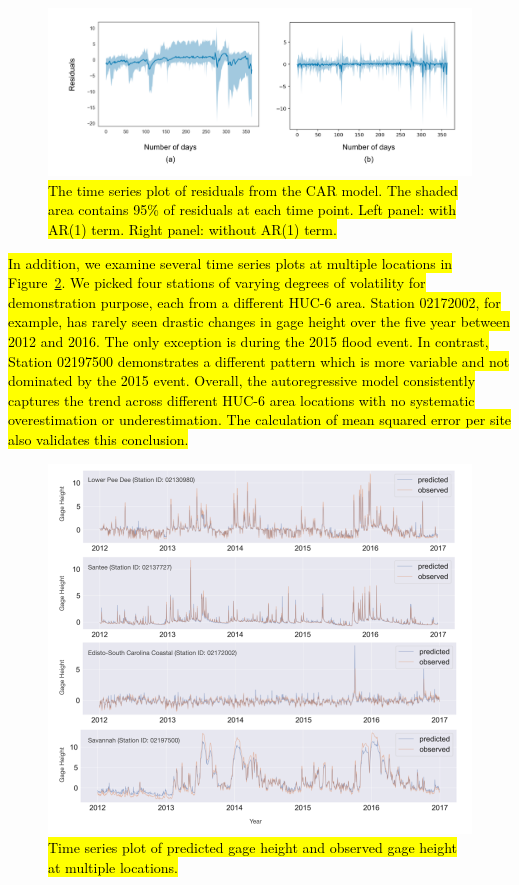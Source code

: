 \begin{figure}[htbp]
\centering
\includegraphics[width=1\textwidth]{../images/residuals_over_time_for_ar_and_non_ar.png}
\caption{\hl{The time series plot of residuals from the CAR model. The shaded area contains {95\%} of residuals at each time point. Left panel: with AR(1) term. Right panel: without AR(1) term.}}
\label{fig:resid_time_series}
\end{figure}

\hl{In addition, we examine several time series plots at multiple locations in Figure~{\ref{fig:per_site}}.
We picked four stations of varying degrees of volatility for demonstration purpose, each from a different HUC-6 area.
Station 02172002, for example, has rarely seen drastic changes in gage height over the five year between 2012
and 2016.
The only exception is during the 2015 flood event.
In contrast, Station 02197500 demonstrates a different pattern which is more variable and not dominated by the 2015
event.
Overall, the autoregressive model consistently captures the trend across different HUC-6 area locations
with no systematic overestimation or underestimation.
The calculation of mean squared error per site also validates this conclusion.} \\

\begin{figure}[htbp]
\centering
\includegraphics[width=1\textwidth]{../images/prediction_of_four_sites.png}
\caption{\hl{Time series plot of predicted gage height and observed gage height at multiple locations.}}
\label{fig:per_site}
\end{figure}

